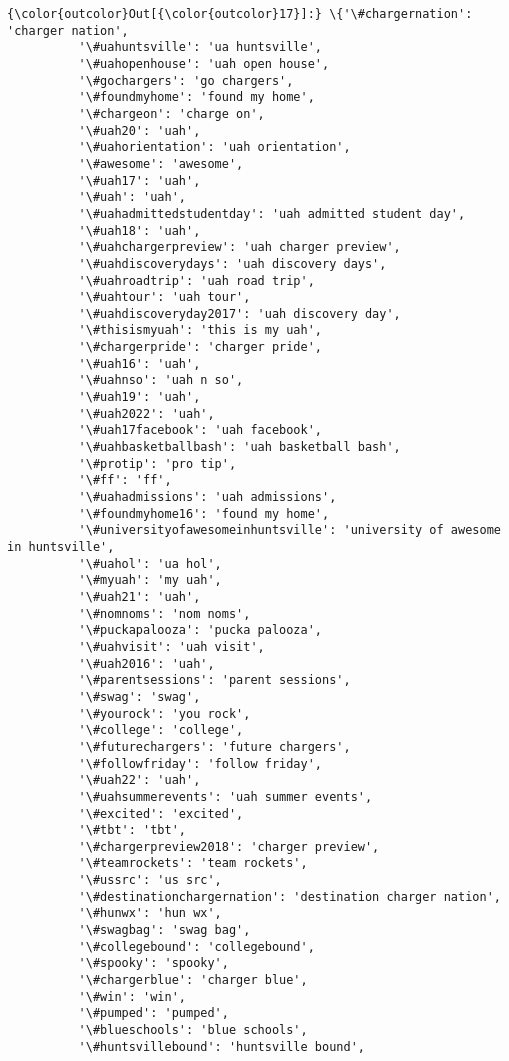 \documentclass[11pt]{article}
\begin{document}
\begin{Verbatim}[commandchars=\\\{\}]
{\color{outcolor}Out[{\color{outcolor}17}]:} \{'\#chargernation': 'charger nation',
          '\#uahuntsville': 'ua huntsville',
          '\#uahopenhouse': 'uah open house',
          '\#gochargers': 'go chargers',
          '\#foundmyhome': 'found my home',
          '\#chargeon': 'charge on',
          '\#uah20': 'uah',
          '\#uahorientation': 'uah orientation',
          '\#awesome': 'awesome',
          '\#uah17': 'uah',
          '\#uah': 'uah',
          '\#uahadmittedstudentday': 'uah admitted student day',
          '\#uah18': 'uah',
          '\#uahchargerpreview': 'uah charger preview',
          '\#uahdiscoverydays': 'uah discovery days',
          '\#uahroadtrip': 'uah road trip',
          '\#uahtour': 'uah tour',
          '\#uahdiscoveryday2017': 'uah discovery day',
          '\#thisismyuah': 'this is my uah',
          '\#chargerpride': 'charger pride',
          '\#uah16': 'uah',
          '\#uahnso': 'uah n so',
          '\#uah19': 'uah',
          '\#uah2022': 'uah',
          '\#uah17facebook': 'uah facebook',
          '\#uahbasketballbash': 'uah basketball bash',
          '\#protip': 'pro tip',
          '\#ff': 'ff',
          '\#uahadmissions': 'uah admissions',
          '\#foundmyhome16': 'found my home',
          '\#universityofawesomeinhuntsville': 'university of awesome in huntsville',
          '\#uahol': 'ua hol',
          '\#myuah': 'my uah',
          '\#uah21': 'uah',
          '\#nomnoms': 'nom noms',
          '\#puckapalooza': 'pucka palooza',
          '\#uahvisit': 'uah visit',
          '\#uah2016': 'uah',
          '\#parentsessions': 'parent sessions',
          '\#swag': 'swag',
          '\#yourock': 'you rock',
          '\#college': 'college',
          '\#futurechargers': 'future chargers',
          '\#followfriday': 'follow friday',
          '\#uah22': 'uah',
          '\#uahsummerevents': 'uah summer events',
          '\#excited': 'excited',
          '\#tbt': 'tbt',
          '\#chargerpreview2018': 'charger preview',
          '\#teamrockets': 'team rockets',
          '\#ussrc': 'us src',
          '\#destinationchargernation': 'destination charger nation',
          '\#hunwx': 'hun wx',
          '\#swagbag': 'swag bag',
          '\#collegebound': 'collegebound',
          '\#spooky': 'spooky',
          '\#chargerblue': 'charger blue',
          '\#win': 'win',
          '\#pumped': 'pumped',
          '\#blueschools': 'blue schools',
          '\#huntsvillebound': 'huntsville bound',

\end{Verbatim}
\end{document}
